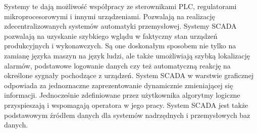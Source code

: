 	\hspace{2em}Systemy te dają możliwość współpracy ze sterownikami PLC, regulatorami mikroprocesorowymi i innymi urządzeniami. Pozwalają na realizację zdecentralizowanych systemów automatyki przemysłowej. Systemy SCADA pozwalają na uzyskanie szybkiego wglądu w faktyczny stan urządzeń produkcyjnych i wykonawczych. Są one doskonałym sposobem nie tylko na zamianę języka maszyn na język ludzi, ale także umożliwiają szybką lokalizację alarmów, podstawowe logowanie danych czy też automatyczną reakcję na określone sygnały pochodzące z urządzeń. System SCADA w warstwie graficznej odpowiada za jednoznaczne zaprezentowanie dynamicznie zmieniającej się informacji. Jednocześnie zdefiniowane przez użytkownika algorytmy logiczne przyspieszają i wspomagają operatora w jego pracy. System SCADA jest także podstawowym źródłem danych dla systemów nadrzędnych i przemysłowych baz danych.
	

